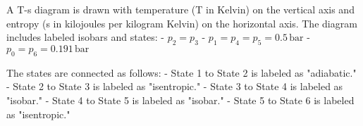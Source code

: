 A T-s diagram is drawn with temperature (T in Kelvin) on the vertical axis and entropy (s in kilojoules per kilogram Kelvin) on the horizontal axis. The diagram includes labeled isobars and states:  
- \( p_2 = p_3 \)  
- \( p_1 = p_4 = p_5 = 0.5 \, \text{bar} \)  
- \( p_0 = p_6 = 0.191 \, \text{bar} \)  

The states are connected as follows:  
- State 1 to State 2 is labeled as "adiabatic."  
- State 2 to State 3 is labeled as "isentropic."  
- State 3 to State 4 is labeled as "isobar."  
- State 4 to State 5 is labeled as "isobar."  
- State 5 to State 6 is labeled as "isentropic."